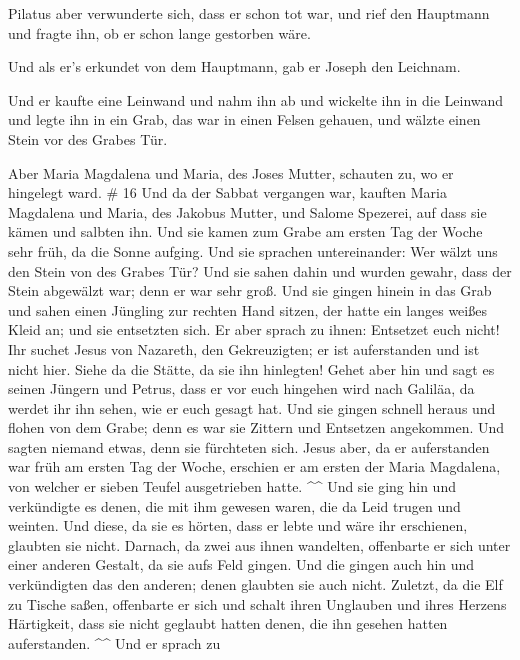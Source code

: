  Pilatus aber verwunderte sich, dass er schon tot war, und
rief den Hauptmann und fragte ihn, ob er schon lange gestorben wäre.

 Und als er's erkundet von dem Hauptmann, gab er Joseph den
Leichnam.

 Und er kaufte eine Leinwand und nahm ihn ab und wickelte
ihn in die Leinwand und legte ihn in ein Grab, das war in einen Felsen
gehauen, und wälzte einen Stein vor des Grabes Tür.

 Aber Maria Magdalena und Maria, des Joses Mutter, schauten
zu, wo er hingelegt ward. \# 16  Und da der Sabbat vergangen
war, kauften Maria Magdalena und Maria, des Jakobus Mutter, und Salome
Spezerei, auf dass sie kämen und salbten ihn.  Und sie kamen
zum Grabe am ersten Tag der Woche sehr früh, da die Sonne aufging.
 Und sie sprachen untereinander: Wer wälzt uns den Stein von
des Grabes Tür?  Und sie sahen dahin und wurden gewahr, dass
der Stein abgewälzt war; denn er war sehr groß.  Und sie
gingen hinein in das Grab und sahen einen Jüngling zur rechten Hand
sitzen, der hatte ein langes weißes Kleid an; und sie entsetzten sich.
 Er aber sprach zu ihnen: Entsetzet euch nicht! Ihr suchet
Jesus von Nazareth, den Gekreuzigten; er ist auferstanden und ist nicht
hier. Siehe da die Stätte, da sie ihn hinlegten!  Gehet aber
hin und sagt es seinen Jüngern und Petrus, dass er vor euch hingehen
wird nach Galiläa, da werdet ihr ihn sehen, wie er euch gesagt hat.
 Und sie gingen schnell heraus und flohen von dem Grabe;
denn es war sie Zittern und Entsetzen angekommen. Und sagten niemand
etwas, denn sie fürchteten sich.  Jesus aber, da er
auferstanden war früh am ersten Tag der Woche, erschien er am ersten der
Maria Magdalena, von welcher er sieben Teufel ausgetrieben hatte.
\^{}\^{}  Und sie ging hin und verkündigte es denen, die
mit ihm gewesen waren, die da Leid trugen und weinten.  Und
diese, da sie es hörten, dass er lebte und wäre ihr erschienen, glaubten
sie nicht.  Darnach, da zwei aus ihnen wandelten,
offenbarte er sich unter einer anderen Gestalt, da sie aufs Feld gingen.
 Und die gingen auch hin und verkündigten das den anderen;
denen glaubten sie auch nicht.  Zuletzt, da die Elf zu
Tische saßen, offenbarte er sich und schalt ihren Unglauben und ihres
Herzens Härtigkeit, dass sie nicht geglaubt hatten denen, die ihn
gesehen hatten auferstanden. \^{}\^{}  Und er sprach zu
